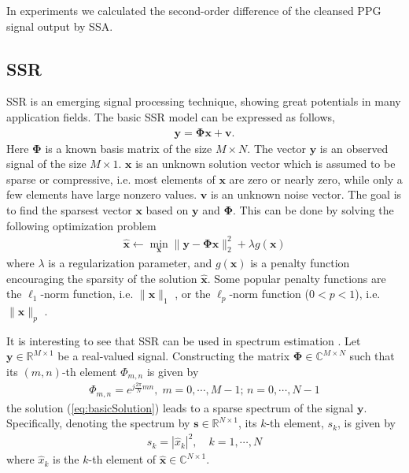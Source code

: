 \documentclass[10pt,twocolumn]{IEEEtran}
\begin{document}
In experiments we calculated the second-order difference of the cleansed PPG signal output by SSA.





\subsection{SSR}

SSR \cite{Gorodnitsky1997,cotter2005sparse,Donoho2006compressed,Eladbook} is an emerging signal processing technique, showing great potentials in many application fields. The basic SSR model can be expressed as follows,
\begin{eqnarray}
\mathbf{y} = \mathbf{\Phi} \mathbf{x} + \mathbf{v}.
\label{eq:basicModel}
\end{eqnarray}
Here $\mathbf{\Phi}$ is a known basis matrix of the size $M \times N$. The vector $\mathbf{y}$ is an observed signal of the size $M \times 1$.  $\mathbf{x}$ is an unknown solution vector which is assumed to be sparse or compressive, i.e. most elements of $\mathbf{x}$  are zero or nearly zero, while only a few elements have large nonzero values. $\mathbf{v}$ is an unknown noise vector. The goal is to find the sparsest vector $\mathbf{x}$ based on $\mathbf{y}$ and $\mathbf{\Phi}$. This can be done by solving the following optimization problem
\begin{eqnarray}
\widehat{\mathbf{x}} \leftarrow \min_{\mathbf{x}} \|\mathbf{y} - \mathbf{\Phi} \mathbf{x}\|_2^2 + \lambda g(\mathbf{x})
\label{eq:basicSolution}
\end{eqnarray}
where $\lambda$ is a regularization parameter, and $g(\mathbf{x})$ is a penalty function encouraging the sparsity of the solution $\widehat{\mathbf{x}}$. Some popular penalty functions are the $\ell_1$-norm function, i.e. $\| \mathbf{x} \|_1$ \cite{lasso}, or the $\ell_p$-norm function ($0<p<1$), i.e. $\| \mathbf{x} \|_p$ \cite{Gorodnitsky1997}.

It is interesting to see that SSR can be used in spectrum estimation \cite{Gorodnitsky1997,duarte2013spectral}. Let $\mathbf{y} \in \mathbb{R}^{M \times 1}$ be a real-valued signal. Constructing the matrix $\mathbf{\Phi} \in \mathbb{C}^{M \times N}$ such that its $(m,n)$-th element ${\Phi}_{m,n}$ is given by
\begin{eqnarray}
\Phi_{m,n} = e^{j \frac{2\pi}{N}mn}, \; m = 0,\cdots,M-1; \, n=0,\cdots,N-1
\label{eq:basis}
\end{eqnarray}
the solution (\ref{eq:basicSolution}) leads to a sparse spectrum of the signal $\mathbf{y}$. Specifically, denoting the spectrum by $\mathbf{s} \in \mathbb{R}^{N\times 1}$, its $k$-th element, $s_k$, is given by
\begin{eqnarray}
s_k = | \widehat{x}_k |^2, \quad k=1,\cdots,N
\end{eqnarray}
where $\widehat{x}_k$ is the $k$-th element of $\widehat{\mathbf{x}} \in \mathbb{C}^{N \times 1}$.
\end{document}
